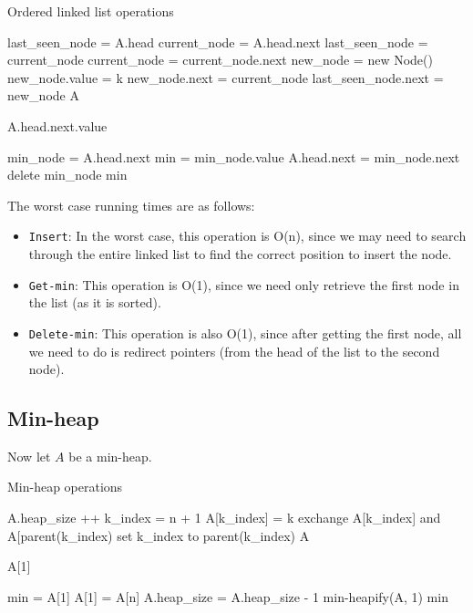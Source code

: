 \documentclass[paper=a4, fontsize=11pt]{scrartcl} %
\numberwithin{equation}{section} %
\numberwithin{figure}{section} %
\numberwithin{table}{section} %
\begin{document}
\begin{algorithm}\small
\caption{Ordered linked list operations}
\begin{algorithmic}
	\State last\_seen\_node = A.head
	\State current\_node = A.head.next
		\State last\_seen\_node = current\_node
		\State current\_node = current\_node.next
	\EndIf 
	\State new\_node = new Node()
	\State new\_node.value = k
	\State new\_node.next = current\_node
	\State last\_seen\_node.next = new\_node	
	\State \Return A
\EndFunction

	\State \Return A.head.next.value
\EndFunction

	\State min\_node = A.head.next
	\State min = min\_node.value
	\State A.head.next = min\_node.next
	\State delete min\_node
	\State \Return min
\EndFunction

\end{algorithmic}
\end{algorithm}

The worst case running times are as follows:

\begin{itemize}
\item \texttt{Insert}: In the worst case, this operation is O(n), since we may need to search through the entire linked list to find the correct position to insert the node.
\item \texttt{Get-min}: This operation is O(1), since we need only retrieve the first node in the list (as it is sorted).
\item \texttt{Delete-min}: This operation is also O(1), since after getting the first node, all we need to do is redirect pointers (from the head of the list to the second node).
\end{itemize}

\subsection{Min-heap} 

Now let $A$ be a min-heap.

 \begin{algorithm}\small
\caption{Min-heap operations}
\begin{algorithmic}
	\State A.heap\_size ++
	\State k\_index = n + 1
	\State A[k\_index] = k
		\State exchange A[k\_index] and A[parent(k\_index)
		\State set k\_index to parent(k\_index)
	\EndWhile
	\State \Return A
\EndFunction

	\State \Return A[1]
\EndFunction

	\State min = A[1]
	\State A[1] = A[n]
	\State A.heap\_size = A.heap\_size - 1
	\State min-heapify(A, 1)
	\State \Return min
\EndFunction

\end{algorithmic}
\end{algorithm}
 
\end{document}
